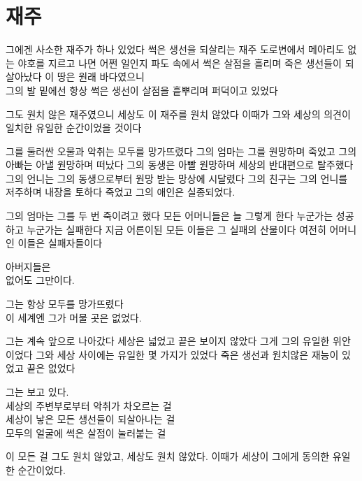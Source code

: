 \hypertarget{uxc7acuxc8fc}{%

\chapter{재주}\label{uxc7acuxc8fc}}



그에겐 사소한 재주가 하나 있었다 썩은 생선을 되살리는 재주 도로변에서 메아리도 없는 야호를 지르고 나면 어쩐 일인지 파도 속에서 썩은 살점을 흘리며 죽은 생선들이 되살아났다 이 땅은 원래 바다였으니\\

그의 발 밑에선 항상 썩은 생선이 살점을 흩뿌리며 퍼덕이고 있었다



그도 원치 않은 재주였으니 세상도 이 재주를 원치 않았다 이때가 그와 세상의 의견이 일치한 유일한 순간이었을 것이다



그를 둘러싼 오물과 악취는 모두를 망가뜨렸다 그의 엄마는 그를 원망하며 죽었고 그의 아빠는 아낼 원망하며 떠났다 그의 동생은 아빨 원망하며 세상의 반대편으로 탈주했다 그의 언니는 그의 동생으로부터 원망 받는 망상에 시달렸다 그의 친구는 그의 언니를 저주하며 내장을 토하다 죽었고 그의 애인은 실종되었다.



그의 엄마는 그를 두 번 죽이려고 했다 모든 어머니들은 늘 그렇게 한다 누군가는 성공하고 누군가는 실패한다 지금 어른이된 모든 이들은 그 실패의 산물이다 여전히 어머니인 이들은 실패자들이다



아버지들은\\

없어도 그만이다.



그는 항상 모두를 망가뜨렸다\\

이 세계엔 그가 머물 곳은 없었다.



그는 계속 앞으로 나아갔다 세상은 넓었고 끝은 보이지 않았다 그게 그의 유일한 위안이었다 그와 세상 사이에는 유일한 몇 가지가 있었다 죽은 생선과 원치않은 재능이 있었고 끝은 없었다



그는 보고 있다.\\

세상의 주변부로부터 악취가 차오르는 걸\\

세상이 낳은 모든 생선들이 되살아나는 걸\\

모두의 얼굴에 썩은 살점이 눌러붙는 걸



이 모든 걸 그도 원치 않았고, 세상도 원치 않았다. 이때가 세상이 그에게 동의한 유일한 순간이었다. ​

